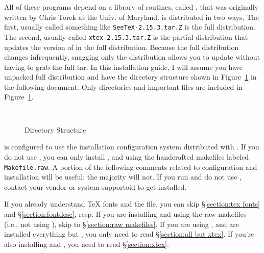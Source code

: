 All of these programs depend on a library of routines, called {\libtex},
that was originally written by Chris Torek at the Univ. of Maryland.
{\seetex} is distributed in two ways.
The first, usually called
something like {\verb|SeeTeX-2.15.3.tar.Z|} is the full {\seetex} distribution.
The second, usually called \verb|xtex-2.15.3.tar.Z| is
the partial {\xtex} distribution that updates the version of {\xtex} in the
full {\seetex} distribution. Because the full {\seetex} distribution
changes infrequently, snagging only the {\xtex} distribution allows
you to update {\xtex} without having to grab the full {\seetex} tar.
In this installation guide, I will assume you have unpacked full 
{\seetex} distribution and have the directory structure shown in
Figure~\ref{figure:directory} in the following document.  Only
directories and important files are included in
Figure~\ref{figure:directory}.


\begin{figure}[t]

\centerline{%
\small
\tt
{}
    \endsubtree
    \endsubtree
    \endsubtree
    \endsubtree
    \endsubtree
    \endsubtree
    \endsubtree
\endtree
}

\caption{{\seetex} Directory Structure}  
\label{figure:directory}
\end{figure}


{\seetex} is configured to use the {\imake} installation configuration
system distributed with {\X}. If you do not use {\imake}, you can
only install {\libtex}, {\texsun} and {\dviselect} using the
handcrafted makefiles labeled {\tt Makefile.raw}. A portion of the
following comments related to configuration and installation will be
useful; the majority will not. If you run {\X} and do not use
{\imake}, contact your vendor or system supportoid to get {\imake}
installed.

If you already understand {\TeX} fonts and the {\fontdesc} file,
you can skip \S\ref{section:tex fonts} and \S\ref{section:fontdesc},
resp.
If you are installing {\texsun} and {\dviselect} using the raw
makefiles (i.e., not using {\imake}), skip to
\S\ref{section:raw makefiles}.
If you are using {\imake}, and are installed everything
but {\xtex}, you only need to read \S\ref{section:all but xtex}.
If you're also installing {\xtex} and {\mftobdf}, you need to
read \S\ref{section:xtex}.


